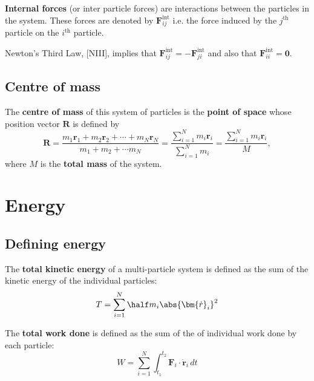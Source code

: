 \documentclass[12pt, a4paper]{article}
\begin{document}
\begin{definition}
    \textbf{Internal forces} (or inter particle forces) are interactions between the particles in the system. These forces are denoted by \(\bm{F}_{ij}^{\text{int}}\) i.e. the force induced by the \(j^{\text{th}}\) particle on the \(i^\text{th}\) particle.
\end{definition}

\begin{theorem}
    Newton's Third Law, [NIII], implies that \(\bm{F}_{ij}^{\text{int}} = -\bm{F}_{ji}^{\text{int}}\) and also that \(\bm{F}_{ii}^{\text{int}} =\bm{0}\).
\end{theorem}

\subsection{Centre of mass}

\begin{definition}
    The \textbf{centre of mass} of this system of particles is the \textbf{point of space} whose position vector \(\bm{R}\) is defined by
    \[\bm{R} = \frac{m_1 \bm{r}_1+m_2 \bm{r}_2 + \cdots +m_N \bm{r}_N}{m_1+m_2+\cdots m_N} = \frac{\sum_{i=1}^N m_i \bm{r}_i}{\sum_{i=1}^N m_i} = \frac{\sum_{i=1}^N m_i \bm{r}_i}{M},\]
    where \(M\) is the \textbf{total mass} of the system.
\end{definition}

\section{Energy}

\subsection{Defining energy}

\begin{definition}
    The \textbf{total kinetic energy} of a multi-particle system is defined as the sum of the kinetic energy of the individual particles:
    \[T=\sum_{i=1}^N \half m_i \abs{\bm{\dot{r}}_i}^2\]
\end{definition}

\begin{definition}
    The \textbf{total work done} is defined as the sum of the of individual work done by each particle: 
    \[W = \sum_{i=1}^N \int_{t_1}^{t_2} \bm{F}_i \cdot \bm{\dot{r}}_i \, dt\]
\end{definition}
\end{document}
